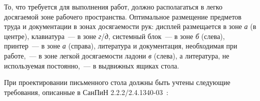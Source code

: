 
То, что требуется для выполнения работ, должно располагаться в легко досягаемой зоне рабочего пространства.
Оптимальное размещение предметов труда и документации в зонах досягаемости рук: дисплей размещается в зоне \textit{а} (в центре), клавиатура~--- в зоне \textit{г}/\textit{д}, системный блок~--- в зоне \textit{б} (слева), принтер~--- в зоне \textit{а} (справа), литература и документация, необходимая при работе,~--- в зоне легкой досягаемости ладони \textit{в} (слева), а литература, не используемая постоянно,~--- в выдвижных ящиках стола. 

При проектировании письменного стола должны быть учтены следующие требования, описанные в СанПиН 2.2.2/2.4.1340-03~\cite{SanPin2003}:

